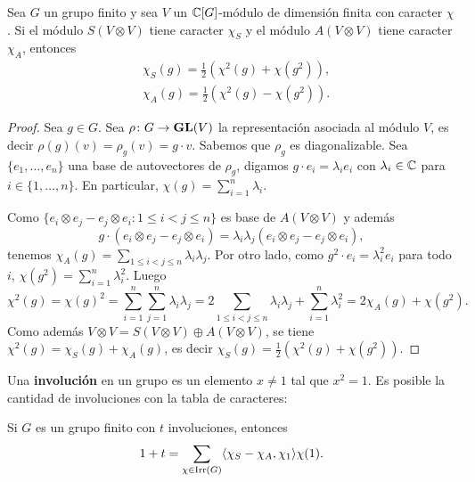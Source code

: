 \begin{proposition}
    Sea $G$ un grupo finito y  
    sea $V$ un $\mathbb{C}[G]$-módulo de dimensión finita con caracter $\chi$. Si el módulo $S(V\otimes V)$ 
    tiene caracter $\chi_S$ y el módulo $A(V\otimes V)$ tiene caracter $\chi_A$, entonces 
    \begin{align*}
        &\chi_S(g)=\frac12(\chi^2(g)+\chi(g^2)),\\
        &\chi_A(g)=\frac12(\chi^2(g)-\chi(g^2)).
    \end{align*}
\end{proposition}

\begin{proof}
    Sea $g\in G$. Sea $\rho\colon G\to\mathbf{GL}(V)$ la representación asociada al módulo $V$, es decir $\rho(g)(v)=\rho_g(v)=g\cdot v$. 
    Sabemos que $\rho_g$ es diagonalizable. Sea $\{e_1,\dots,e_n\}$ una base de autovectores de $\rho_g$, digamos
    $g\cdot e_i=\lambda_ie_i$ con $\lambda_i\in\mathbb{C}$ para $i\in\{1,\dots,n\}$. En particular, $\chi(g)=\sum_{i=1}^n\lambda_i$. 
    
    Como $\{e_i\otimes e_j-e_j\otimes e_i:1\leq i<j\leq n\}$ es base de $A(V\otimes V)$ y además 
    \[
    g\cdot (e_i\otimes e_j-e_j\otimes e_i)=\lambda_i\lambda_j(e_i\otimes e_j-e_j\otimes e_i),
    \]
    tenemos $\chi_A(g)=\sum_{1\leq i<j\leq n}\lambda_i\lambda_j$. Por otro lado, como $g^2\cdot e_i=\lambda_i^2e_i$ para todo $i$,
    $\chi(g^2)=\sum_{i=1}^n\lambda_i^2$. Luego
    \[
    \chi^2(g)=\chi(g)^2=\sum_{i=1}^n\sum_{j=1}^n\lambda_i\lambda_j=2\sum_{1\leq i<j\leq n}\lambda_i\lambda_j+\sum_{i=1}^n\lambda_i^2=2\chi_A(g)+\chi(g^2).
    \]
    Como además $V\otimes V=S(V\otimes V)\oplus A(V\otimes V)$, se tiene 
    $\chi^2(g)=\chi_S(g)+\chi_A(g)$, es decir 
    $\chi_S(g)=\frac12(\chi^2(g)+\chi(g^2))$.
\end{proof}

Una \textbf{involución} en un grupo es un elemento $x\ne 1$ tal que $x^2=1$. 
Es posible la cantidad de involuciones 
con la tabla de caracteres:

\begin{proposition}
Si $G$ es un grupo finito con $t$ involuciones, entonces 
\[
1+t=\sum_{\chi\in\operatorname{Irr}(G)}\langle\chi_S-\chi_A,\chi_1\rangle\chi(1).
\]
\end{proposition}


